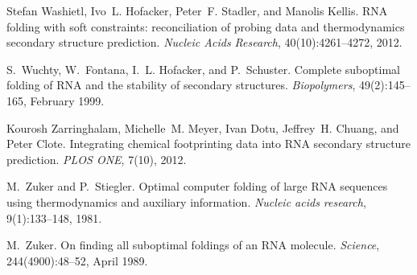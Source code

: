 \begin{DoxyDescription}
\item[\label{_CITEREF_washietl:2012}%
\mbox{[}16\mbox{]}]Stefan Washietl, Ivo~L. Hofacker, Peter~F. Stadler, and Manolis Kellis. R\-N\-A folding with soft constraints\-: reconciliation of probing data and thermodynamics secondary structure prediction. {\itshape Nucleic Acids Research}, 40(10)\-:4261--4272, 2012.


\item[\label{_CITEREF_wuchty:1999}%
\mbox{[}17\mbox{]}]S.~Wuchty, W.~Fontana, I.~L. Hofacker, and P.~Schuster. Complete suboptimal folding of R\-N\-A and the stability of secondary structures. {\itshape Biopolymers}, 49(2)\-:145--165, February 1999.


\item[\label{_CITEREF_zarringhalam:2012}%
\mbox{[}18\mbox{]}]Kourosh Zarringhalam, Michelle~M. Meyer, Ivan Dotu, Jeffrey~H. Chuang, and Peter Clote. Integrating chemical footprinting data into R\-N\-A secondary structure prediction. {\itshape P\-L\-O\-S O\-N\-E}, 7(10), 2012.


\item[\label{_CITEREF_zuker:1981}%
\mbox{[}19\mbox{]}]M.~Zuker and P.~Stiegler. Optimal computer folding of large R\-N\-A sequences using thermodynamics and auxiliary information. {\itshape Nucleic acids research}, 9(1)\-:133--148, 1981.


\item[\label{_CITEREF_zuker:1989}%
\mbox{[}20\mbox{]}]M.~Zuker. On finding all suboptimal foldings of an R\-N\-A molecule. {\itshape Science}, 244(4900)\-:48--52, April 1989.


\end{DoxyDescription}